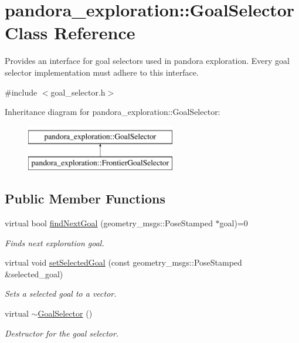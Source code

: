 \hypertarget{classpandora__exploration_1_1_goal_selector}{\section{pandora\-\_\-exploration\-:\-:\-Goal\-Selector \-Class \-Reference}
\label{classpandora__exploration_1_1_goal_selector}
}


\-Provides an interface for goal selectors used in pandora exploration. \-Every goal selector implementation must adhere to this interface.  




{\ttfamily \#include $<$goal\-\_\-selector.\-h$>$}

\-Inheritance diagram for pandora\-\_\-exploration\-:\-:\-Goal\-Selector\-:\begin{figure}[H]
\begin{center}
\leavevmode
\includegraphics[height=2.000000cm]{classpandora__exploration_1_1_goal_selector}
\end{center}
\end{figure}
\subsection*{\-Public \-Member \-Functions}
\begin{DoxyCompactItemize}
\item 
virtual bool \hyperlink{classpandora__exploration_1_1_goal_selector_a0f22d1642c779a143227ddc82dadaeca}{find\-Next\-Goal} (geometry\-\_\-msgs\-::\-Pose\-Stamped $\ast$goal)=0
\begin{DoxyCompactList}\small\item\em \-Finds next exploration goal. \end{DoxyCompactList}\item 
virtual void \hyperlink{classpandora__exploration_1_1_goal_selector_af7aec6f4da8c7cad2a4ad6342badd208}{set\-Selected\-Goal} (const geometry\-\_\-msgs\-::\-Pose\-Stamped \&selected\-\_\-goal)
\begin{DoxyCompactList}\small\item\em \-Sets a selected goal to a vector. \end{DoxyCompactList}\item 
virtual \hyperlink{classpandora__exploration_1_1_goal_selector_aa2af375bc6c55c08ea16e21a151b955f}{$\sim$\-Goal\-Selector} ()
\begin{DoxyCompactList}\small\item\em \-Destructor for the goal selector. \end{DoxyCompactList}\end{DoxyCompactItemize}
